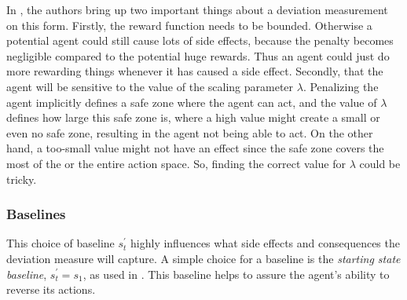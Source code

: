 \documentclass[12pt,A4]{report}
\newcommand{\autobaj}{}
\theoremstyle{definition}
\begin{document}
In \citet{ArmstrongLevinstein}, the authors bring up two important things about a deviation measurement on this form. Firstly, the reward function needs to be bounded. Otherwise a potential agent could still cause lots of side effects, because the penalty becomes negligible compared to the potential huge rewards. Thus an agent could just do more rewarding things whenever it has caused a side effect. Secondly, that the agent will be sensitive to the value of the scaling parameter $\lambda$. Penalizing the agent implicitly defines a safe zone where the agent can act, and the value of $\lambda$ defines how large this safe zone is, where a high value might create a small or even no safe zone, resulting in the agent not being able to act. On the other hand, a too-small value might not have an effect since the safe zone covers the most of the or the entire action space. So, finding the correct value for $\lambda$ could be tricky. 





\subsubsection{Baselines}
This choice of baseline $s^\prime_t$ highly influences what side effects and consequences the deviation measure will capture. A simple choice for a baseline is the \textit{starting state baseline}, $s^{\prime}_t = s_1$, as used in \citet{Eysenbach}. This baseline helps to assure the agent's ability to reverse its actions. 
\end{document}
